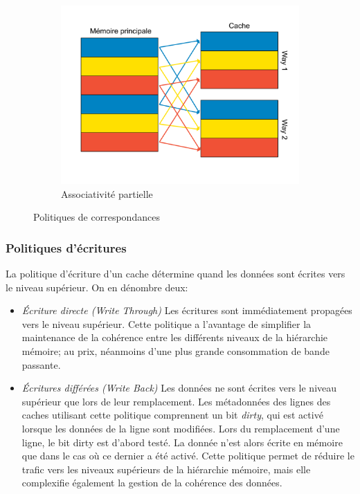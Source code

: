 \begin{figure}[!h]
\begin{subfigure}[b]{0.5\linewidth}
		\includegraphics[width=\linewidth]{graphics/figures/cache-set-assoc.pdf}
		\caption{\label{fig:set_assoc}Associativité partielle}
	\end{subfigure}
	\caption{\label{fig:indexation_associativité} Politiques de correspondances}
\end{figure}

\subsubsection{Politiques d'écritures}

La politique d'écriture d'un cache détermine quand les données sont écrites vers le niveau supérieur.
On en dénombre deux:

\begin{itemize}
	\item \emph{Écriture directe (Write Through)} Les écritures sont immédiatement propagées vers le niveau supérieur.
	Cette politique a l'avantage de simplifier la maintenance de la cohérence entre les différents niveaux de la hiérarchie mémoire; au prix, néanmoins d'une plus grande consommation de bande passante.
	
	\item \emph{Écritures différées (Write Back)} Les données ne sont écrites vers le niveau supérieur que lors de leur remplacement.
	Les métadonnées des lignes des caches utilisant cette politique comprennent un bit \emph{dirty}, qui est activé lorsque les données de la ligne sont modifiées.
	Lors du remplacement d'une ligne, le bit dirty est d'abord testé.
	La donnée n'est alors écrite en mémoire que dans le cas où ce dernier a été activé.
	Cette politique permet de réduire le trafic vers les niveaux supérieurs de la hiérarchie mémoire, mais elle complexifie également la gestion de la cohérence des données.
\end{itemize}


